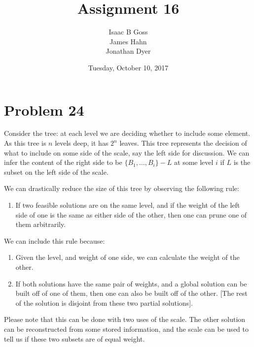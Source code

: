 \documentclass{article}
\author{Isaac B Goss\\ James Hahn\\ Jonathan Dyer}
\title{Assignment 16}
\date{Tuesday, October 10,  2017}
\providecommand{\prob}[1]{\section*{Problem #1}}
\begin{document}
\maketitle

    \prob{24}
    Consider the tree: at each level we are deciding whether to include some element.
    As this tree is $n$ levels deep, it has $2^n$ leaves.
    This tree represents the decision of what to include on some side of the scale, say the left side for discussion.
    We can infer the content of the right side to be $\{B_1, \dots, B_i\} - L$ at some level $i$ if $L$ is the subset on the left side of the scale.

    We can drastically reduce the size of this tree by observing the following rule:
    \begin{enumerate}
        \item If two feasible solutions are on the same level, 
        and if the weight of the left side of one is the same as either side of the other, 
        then one can prune one of them arbitrarily.
    \end{enumerate}
    We can include this rule because:
    \begin{enumerate}[label=\roman*)]
        \item Given the level, and weight of one side, we can calculate the weight of the other.
        \item If both solutions have the same pair of weights, and a global solution can be built off of one of them,
            then one can also be built off of the other. 
            [The rest of the solution is disjoint from these two partial solutions].
    \end{enumerate}
    Please note that this can be done with two uses of the scale.
    The other solution can be reconstructed from some stored information, 
    and the scale can be used to tell us if these two subsets are of equal weight.
\end{document}
